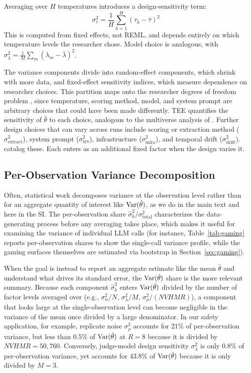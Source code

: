 Averaging over $H$ temperatures introduces a design-sensitivity term:
\begin{equation}
\sigma^2_\tau = \frac{1}{H}\sum_{h=1}^{H}(\tau_h - \bar{\tau})^2
\end{equation}
This is computed from fixed effects, not REML, and depends entirely on which temperature levels the researcher chose. Model choice is analogous, with $\sigma^2_\lambda = \frac{1}{M}\sum_m(\lambda_m - \bar{\lambda})^2$.

The variance components divide into random-effect components, which shrink with more data, and fixed-effect sensitivity indices, which measure dependence on researcher choices. This partition maps onto the researcher degrees of freedom problem \citep{simmons2011falsepositive}, since temperature, scoring method, model, and system prompt are arbitrary choices that could have been made differently. TEE quantifies the sensitivity of $\hat{\theta}$ to each choice, analogous to the multiverse analysis of \citet{steegen2016multiverse}. Further design choices that can vary across runs include scoring or extraction method ($\sigma^2_{\text{extract}}$), system prompt ($\sigma^2_{\text{sys}}$), infrastructure ($\sigma^2_{\text{infra}}$), and temporal drift ($\sigma^2_{\text{drift}}$). \citet{barrie2025replication} catalog these. Each enters as an additional fixed factor when the design varies it.

\subsection{Per-Observation Variance Decomposition}
\label{si:per_observation}

Often, statistical work decomposes variance at the observation level rather than for an aggregate quantity of interest like $\operatorname{Var}(\hat{\theta})$, as we do in the main text and here in the SI. The per-observation share $\hat\sigma^2_k / \sigma^2_{\text{total}}$ characterizes the data-generating process before any averaging takes place, which makes it useful for examining the variance of individual LLM calls (for instance, Table~\ref{tab:gaming} reports per-observation shares to show the single-call variance profile, while the gaming surfaces themselves are estimated via bootstrap in Section~\ref{sec:gaming}).

When the goal is instead to report an aggregate estimate like the mean $\hat\theta$ and understand what drives its standard error, the $\operatorname{Var}(\hat\theta)$ share is the more relevant summary. Because each component $\hat\sigma^2_k$ enters $\operatorname{Var}(\hat\theta)$ divided by the number of factor levels averaged over (e.g., $\sigma^2_\alpha/N$, $\sigma^2_\lambda/M$, $\sigma^2_\rho/(NVHMR)$), a component that looks large at the single-observation level can become negligible in the variance of the mean once divided by a large denominator. In our safety application, for example, replicate noise $\sigma^2_\rho$ accounts for 21\% of per-observation variance, but less than 0.5\% of $\operatorname{Var}(\hat\theta)$ at $R = 8$ because it is divided by $NVHMR = 50{,}760$. Conversely, judge-model design sensitivity $\sigma^2_\lambda$ is only 0.8\% of per-observation variance, yet accounts for 43.8\% of $\operatorname{Var}(\hat\theta)$ because it is only divided by $M = 3$.

